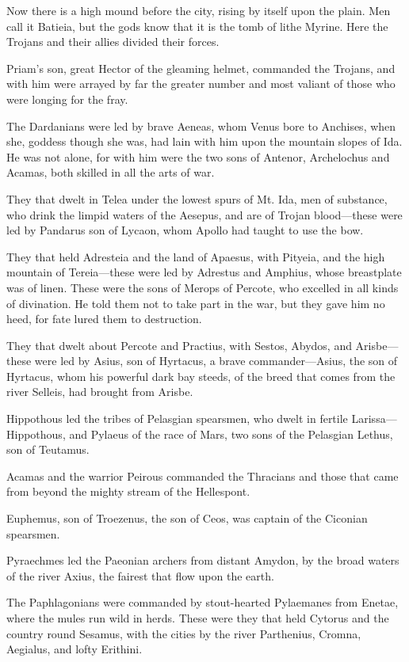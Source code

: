 Now there is a high mound before the city, rising by itself upon the
plain. Men call it Batieia, but the gods know that it is the tomb of lithe
Myrine. Here the Trojans and their allies divided their forces.

Priam’s son, great Hector of the gleaming helmet, commanded the Trojans,
and with him were arrayed by far the greater number and most valiant of
those who were longing for the fray.

The Dardanians were led by brave Aeneas, whom Venus bore to Anchises, when
she, goddess though she was, had lain with him upon the mountain slopes of
Ida. He was not alone, for with him were the two sons of Antenor,
Archelochus and Acamas, both skilled in all the arts of war.

They that dwelt in Telea under the lowest spurs of Mt. Ida, men of
substance, who drink the limpid waters of the Aesepus, and are of Trojan
blood—these were led by Pandarus son of Lycaon, whom Apollo had
taught to use the bow.

They that held Adresteia and the land of Apaesus, with Pityeia, and the
high mountain of Tereia—these were led by Adrestus and Amphius,
whose breastplate was of linen. These were the sons of Merops of Percote,
who excelled in all kinds of divination. He told them not to take part in
the war, but they gave him no heed, for fate lured them to destruction.

They that dwelt about Percote and Practius, with Sestos, Abydos, and
Arisbe—these were led by Asius, son of Hyrtacus, a brave commander—Asius,
the son of Hyrtacus, whom his powerful dark bay steeds, of the breed that
comes from the river Selleis, had brought from Arisbe.

Hippothous led the tribes of Pelasgian spearsmen, who dwelt in fertile
Larissa—Hippothous, and Pylaeus of the race of Mars, two sons of the
Pelasgian Lethus, son of Teutamus.

Acamas and the warrior Peirous commanded the Thracians and those that came
from beyond the mighty stream of the Hellespont.

Euphemus, son of Troezenus, the son of Ceos, was captain of the Ciconian
spearsmen.

Pyraechmes led the Paeonian archers from distant Amydon, by the broad
waters of the river Axius, the fairest that flow upon the earth.

The Paphlagonians were commanded by stout-hearted Pylaemanes from Enetae,
where the mules run wild in herds. These were they that held Cytorus and
the country round Sesamus, with the cities by the river Parthenius,
Cromna, Aegialus, and lofty Erithini.

